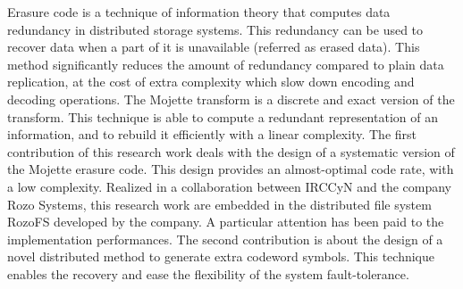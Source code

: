 
Erasure code is a technique of information theory that computes data redundancy
in distributed storage systems. This redundancy can be used to recover data
when a part of it is unavailable (referred as erased data). This method
significantly reduces the amount of redundancy compared to plain data
replication, at the cost of extra complexity which slow down encoding and
decoding operations.
%
The Mojette transform is a discrete and exact version of the \radon transform.
This technique is able to compute a redundant representation of an information,
and to rebuild it efficiently with a linear complexity.
%
The first contribution of this research work deals with the design of a
systematic version of the Mojette erasure code. This design provides an
almost-optimal code rate, with a low complexity.
%
Realized in a collaboration between IRCCyN and the company Rozo Systems, this
research work are embedded in the distributed file system RozoFS developed by
the company. A particular attention has been paid to the implementation
performances.
%
The second contribution is about the design of a novel distributed method to
generate extra codeword symbols. This technique enables the recovery and ease
the flexibility of the system fault-tolerance.


